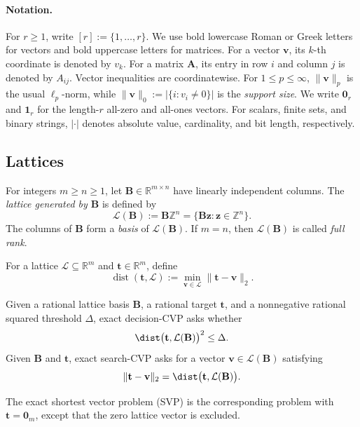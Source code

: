 \paragraph{Notation.}
For \(r\geq1\), write \([r]:=\{1,\ldots,r\}\).  We use bold lowercase
Roman or Greek letters for vectors and bold uppercase letters for matrices.
For a vector \(\mathbf v\), its \(k\)-th coordinate is denoted by \(v_k\).
For a matrix \(\mathbf A\), its entry in row \(i\) and column \(j\) is denoted
by \(A_{ij}\).  Vector inequalities are coordinatewise.  For
\(1\leq p\leq\infty\),
\(\|\mathbf v\|_p\) is the usual \(\ell_p\)-norm, while
\(\|\mathbf v\|_0:=|\{i:v_i\neq0\}|\) is the
\emph{support size}.  We write
\(\mathbf 0_r\) and \(\mathbf 1_r\) for the length-\(r\) all-zero and
all-ones vectors.  For scalars, finite sets,
and binary strings, \(|\cdot|\) denotes absolute value, cardinality, and bit
length, respectively.

\subsection{Lattices}
\label{sec:simple-lattices}

For integers \(m\geq n\geq1\), let
\(\mathbf B\in\mathbb{R}^{m\times n}\) have linearly independent columns. The
\emph{lattice generated by \(\mathbf B\)} is defined by
\[
  \mathcal{L}(\mathbf B)\mathrel{:=}\mathbf B\mathbb{Z}^n
  =\{\mathbf B\mathbf z:\mathbf z\in\mathbb{Z}^n\}.
\]
The columns of $\mathbf B$ form a \emph{basis} of
$\mathcal{L}(\mathbf B)$. If $m=n$, then $\mathcal{L}(\mathbf B)$ is called
\emph{full rank}.

For a lattice \(\mathcal L\subseteq\mathbb R^m\) and
\(\mathbf t\in\mathbb R^m\), define
\[
  \operatorname{dist}(\mathbf t,\mathcal{L})
  \mathrel{:=}\min_{\mathbf v\in\mathcal{L}}\|\mathbf t-\mathbf v\|_2.
\]

\begin{definition}
Given a rational lattice basis $\mathbf B$, a rational target $\mathbf t$,
and a nonnegative rational squared threshold $\Delta$, exact decision-CVP
asks whether
\[
  \dist\bigl(\mathbf t,\mathcal L(\mathbf B)\bigr)^2\leq\Delta.
\]
Given $\mathbf B$ and $\mathbf t$, exact search-CVP asks for a vector
$\mathbf v\in\mathcal L(\mathbf B)$ satisfying
\[
  \|\mathbf t-\mathbf v\|_2
  =\dist\bigl(\mathbf t,\mathcal L(\mathbf B)\bigr).
\]
\end{definition}
The exact shortest vector problem (SVP) is the corresponding problem with
$\mathbf t=\mathbf 0_m$, except that the zero lattice vector is excluded.

